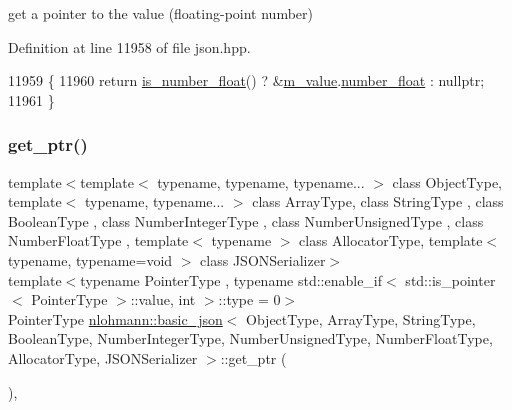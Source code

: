 get a pointer to the value (floating-\/point number) 



Definition at line 11958 of file json.\+hpp.


\begin{DoxyCode}
11959     \{
11960         \textcolor{keywordflow}{return} \hyperlink{classnlohmann_1_1basic__json_a33b4bf898b857c962e798fc7f6e86e70}{is\_number\_float}() ? &\hyperlink{classnlohmann_1_1basic__json_aeb0814f76966f99290cb29e127c90a77}{m\_value}.\hyperlink{unionnlohmann_1_1basic__json_1_1json__value_ad003495e39e78b8096e0b6fc690d146f}{number\_float} : \textcolor{keyword}{nullptr};
11961     \}
\end{DoxyCode}
\mbox{\label{classnlohmann_1_1basic__json_aefa46bd2d96bb77a38d1c8b431eab44f}} 
\subsubsection{\texorpdfstring{get\+\_\+ptr()}{get\_ptr()}\hspace{0.1cm}{\footnotesize\ttfamily [1/2]}}
{\footnotesize\ttfamily template$<$template$<$ typename, typename, typename... $>$ class Object\+Type, template$<$ typename, typename... $>$ class Array\+Type, class String\+Type , class Boolean\+Type , class Number\+Integer\+Type , class Number\+Unsigned\+Type , class Number\+Float\+Type , template$<$ typename $>$ class Allocator\+Type, template$<$ typename, typename=void $>$ class J\+S\+O\+N\+Serializer$>$ \\
template$<$typename Pointer\+Type , typename std\+::enable\+\_\+if$<$ std\+::is\+\_\+pointer$<$ Pointer\+Type $>$\+::value, int $>$\+::type  = 0$>$ \\
Pointer\+Type \hyperlink{classnlohmann_1_1basic__json}{nlohmann\+::basic\+\_\+json}$<$ Object\+Type, Array\+Type, String\+Type, Boolean\+Type, Number\+Integer\+Type, Number\+Unsigned\+Type, Number\+Float\+Type, Allocator\+Type, J\+S\+O\+N\+Serializer $>$\+::get\+\_\+ptr (\begin{DoxyParamCaption}{ }\end{DoxyParamCaption})\hspace{0.3cm}{\ttfamily [inline]}, {\ttfamily [noexcept]}}




